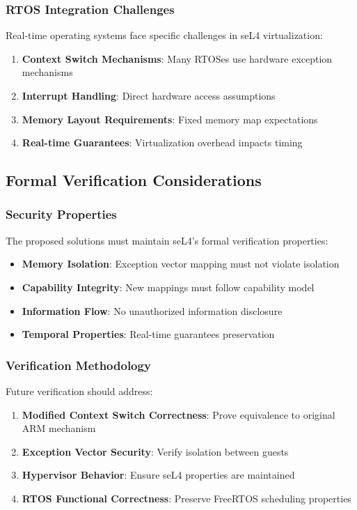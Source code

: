 \documentclass[11pt,a4paper]{article}
\begin{document}
\subsubsection{RTOS Integration Challenges}

Real-time operating systems face specific challenges in seL4 virtualization:

\begin{enumerate}
    \item \textbf{Context Switch Mechanisms}: Many RTOSes use hardware exception mechanisms
    \item \textbf{Interrupt Handling}: Direct hardware access assumptions
    \item \textbf{Memory Layout Requirements}: Fixed memory map expectations
    \item \textbf{Real-time Guarantees}: Virtualization overhead impacts timing
\end{enumerate}

\subsection{Formal Verification Considerations}

\subsubsection{Security Properties}

The proposed solutions must maintain seL4's formal verification properties:

\begin{itemize}
    \item \textbf{Memory Isolation}: Exception vector mapping must not violate isolation
    \item \textbf{Capability Integrity}: New mappings must follow capability model
    \item \textbf{Information Flow}: No unauthorized information disclosure
    \item \textbf{Temporal Properties}: Real-time guarantees preservation
\end{itemize}

\subsubsection{Verification Methodology}

Future verification should address:

\begin{enumerate}
    \item \textbf{Modified Context Switch Correctness}: Prove equivalence to original ARM mechanism
    \item \textbf{Exception Vector Security}: Verify isolation between guests
    \item \textbf{Hypervisor Behavior}: Ensure seL4 properties are maintained
    \item \textbf{RTOS Functional Correctness}: Preserve FreeRTOS scheduling properties
\end{enumerate}
\end{document}
